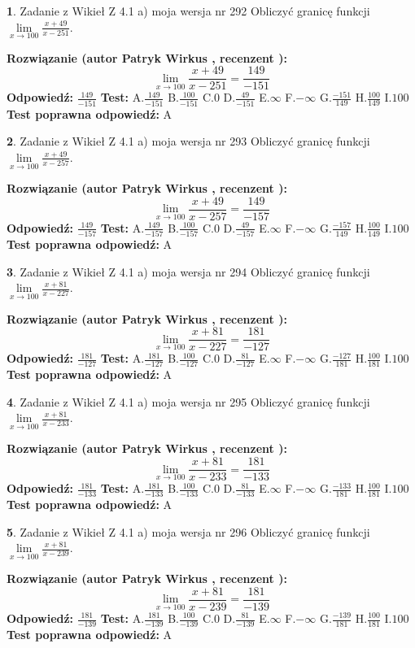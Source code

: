 \documentclass[12pt, a4paper]{article}
\theoremstyle{definition} %
\newtheorem{zad}{}
\newcommand{\zadStart}[1]{\begin{zad}#1\newline}
\newcommand{\zadStop}{\end{zad}}
\newcommand{\rozwStart}[2]{\noindent \textbf{Rozwiązanie (autor #1 , recenzent #2): }\newline}
\newcommand{\rozwStop}{\newline}
\newcommand{\odpStart}{\noindent \textbf{Odpowiedź:}\newline}
\newcommand{\odpStop}{\newline}
\newcommand{\testStart}{\noindent \textbf{Test:}\newline}
\newcommand{\testStop}{\newline}
\newcommand{\kluczStart}{\noindent \textbf{Test poprawna odpowiedź:}\newline}
\newcommand{\kluczStop}{\newline}
\begin{document}
\zadStart{Zadanie z Wikieł Z 4.1 a) moja wersja nr 292}
Obliczyć granicę funkcji $\lim\limits_{x\to100}\frac{x+49}{x-251}$.
\zadStop
\rozwStart{Patryk Wirkus}{}
$$\lim\limits_{x\to100}\frac{x+49}{x-251} = \frac{149}{-151}$$
\rozwStop
\odpStart
$\frac{149}{-151}$
\odpStop
\testStart
A.$\frac{149}{-151}$
B.$\frac{100}{-151}$
C.$0$
D.$\frac{49}{-151}$
E.$\infty$
F.$-\infty$
G.$\frac{-151}{149}$
H.$\frac{100}{149}$
I.$100$
\testStop
\kluczStart
A
\kluczStop



\zadStart{Zadanie z Wikieł Z 4.1 a) moja wersja nr 293}
Obliczyć granicę funkcji $\lim\limits_{x\to100}\frac{x+49}{x-257}$.
\zadStop
\rozwStart{Patryk Wirkus}{}
$$\lim\limits_{x\to100}\frac{x+49}{x-257} = \frac{149}{-157}$$
\rozwStop
\odpStart
$\frac{149}{-157}$
\odpStop
\testStart
A.$\frac{149}{-157}$
B.$\frac{100}{-157}$
C.$0$
D.$\frac{49}{-157}$
E.$\infty$
F.$-\infty$
G.$\frac{-157}{149}$
H.$\frac{100}{149}$
I.$100$
\testStop
\kluczStart
A
\kluczStop



\zadStart{Zadanie z Wikieł Z 4.1 a) moja wersja nr 294}
Obliczyć granicę funkcji $\lim\limits_{x\to100}\frac{x+81}{x-227}$.
\zadStop
\rozwStart{Patryk Wirkus}{}
$$\lim\limits_{x\to100}\frac{x+81}{x-227} = \frac{181}{-127}$$
\rozwStop
\odpStart
$\frac{181}{-127}$
\odpStop
\testStart
A.$\frac{181}{-127}$
B.$\frac{100}{-127}$
C.$0$
D.$\frac{81}{-127}$
E.$\infty$
F.$-\infty$
G.$\frac{-127}{181}$
H.$\frac{100}{181}$
I.$100$
\testStop
\kluczStart
A
\kluczStop



\zadStart{Zadanie z Wikieł Z 4.1 a) moja wersja nr 295}
Obliczyć granicę funkcji $\lim\limits_{x\to100}\frac{x+81}{x-233}$.
\zadStop
\rozwStart{Patryk Wirkus}{}
$$\lim\limits_{x\to100}\frac{x+81}{x-233} = \frac{181}{-133}$$
\rozwStop
\odpStart
$\frac{181}{-133}$
\odpStop
\testStart
A.$\frac{181}{-133}$
B.$\frac{100}{-133}$
C.$0$
D.$\frac{81}{-133}$
E.$\infty$
F.$-\infty$
G.$\frac{-133}{181}$
H.$\frac{100}{181}$
I.$100$
\testStop
\kluczStart
A
\kluczStop



\zadStart{Zadanie z Wikieł Z 4.1 a) moja wersja nr 296}
Obliczyć granicę funkcji $\lim\limits_{x\to100}\frac{x+81}{x-239}$.
\zadStop
\rozwStart{Patryk Wirkus}{}
$$\lim\limits_{x\to100}\frac{x+81}{x-239} = \frac{181}{-139}$$
\rozwStop
\odpStart
$\frac{181}{-139}$
\odpStop
\testStart
A.$\frac{181}{-139}$
B.$\frac{100}{-139}$
C.$0$
D.$\frac{81}{-139}$
E.$\infty$
F.$-\infty$
G.$\frac{-139}{181}$
H.$\frac{100}{181}$
I.$100$
\testStop
\kluczStart
A
\kluczStop
\end{document}
